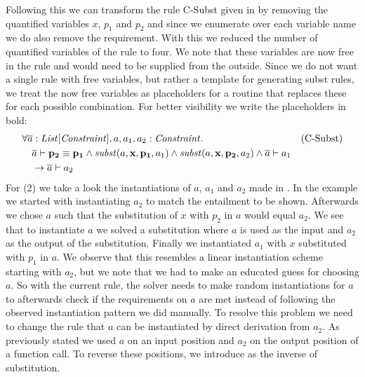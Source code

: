 Following this we can transform the rule C-Subst given in 
by removing the quantified variables $x$, $p_1$ and $p_2$
and since we enumerate over each variable name
we do also remove the  requirement.
With this we reduced the number of quantified variables
of the rule to four.
We note that these variables are now free in the rule
and would need to be supplied from the outside.
Since we do not want a single rule with free variables,
but rather a template for generating subst rules,
we treat the now free variables as placeholders for
a routine that replaces these for each possible combination.
For better visibility we write the placeholders in bold: %
\begin{align*}
&\forall \overline{a}: \mathit{List[\mathit{Constraint}]}, a, a_1, a_2: \mathit{Constraint}. && \text{(C-Subst)} \\
&\quad \overline{a} \vdash \mathit{\mathbf{p_2}} \equiv \mathit{\mathbf{p_1}}
         \land \mathit{subst}(a, \mathbf{x}, \mathbf{p_1}, a_1) \land \mathit{subst}(a, \mathbf{x}, \mathbf{p_2}, a_2)
       \land \overline{a} \vdash a_1\\
&\quad \rightarrow \overline{a} \vdash a_2
\end{align*}
%
For (2) we take a look the instantiations of $a$, $a_1$ and $a_2$
made in .
In the example we started with instantiating $a_2$ to match
the entailment to be shown.
Afterwards we chose $a$ such that the substitution of
$x$ with $p_2$ in $a$ would equal $a_2$.
We see that to instantiate $a$ we solved a substitution
where $a$ is used as the input and $a_2$ as the output of the substitution.
Finally we instantiated $a_1$ with $x$ substituted with $p_1$ in $a$.
We observe that this resembles a linear instantiation scheme starting with $a_2$,
but we note that we had to make an educated guess for choosing $a$.
So with the current rule, the solver needs to make random instantiations
for $a$ to afterwards check if the requirements on $a$ are met
instead of following the observed instantiation pattern we did manually.
To resolve this problem we need to change the rule that $a$ can be
instantiated by direct derivation from $a_2$.
As previously stated we used $a$ on an input position
and $a_2$ on the output position of a function call.
To reverse these positions, we introduce  as
the inverse of substitution.

